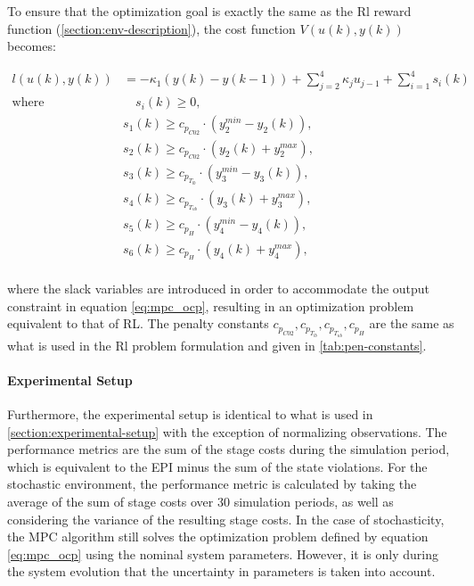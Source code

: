To ensure that the optimization goal is exactly the same as the Rl reward function (\autoref{section:env-description}), the cost function $V(u(k),y(k))$ becomes:

\begin{equation} \label{eq:mpc_cost_function}
	\begin{aligned}
		l(u(k),y(k)) & = - \kappa_1 (y(k) - y(k-1)) + \sum_{j=2}^4 {\kappa_j u_{j-1}} + \sum_{i = 1}^4 s_i(k) \\
		\text{where} & \quad s_i(k) \geq 0, \\
		& s_1(k) \geq c_{p_{C02}} \cdot (y_2^{min} - y_2(k)), \\ 
		& s_2(k) \geq c_{p_{C02}} \cdot (y_2(k) + y_2^{max}), \\ 
		& s_3(k) \geq c_{p_{T_{lb}}} \cdot (y_3^{min} - y_3(k)), \\ 
		& s_4(k) \geq c_{p_{T_{ub}}} \cdot (y_3(k) + y_3^{max}), \\ 
		& s_5(k) \geq c_{p_{H}} \cdot (y_4^{min} - y_4(k)), \\ 
		& s_6(k) \geq c_{p_{H}} \cdot (y_4(k) + y_4^{max}), \\
	\end{aligned}	
\end{equation}

where the slack variables are introduced in order to accommodate the output constraint in equation \autoref{eq:mpc_ocp}, resulting in an optimization problem equivalent to that of RL. The penalty constants $c_{p_{C02}},c_{p_{T_{lb}}},c_{p_{T_{ub}}},c_{p_{H}}$ are the same as what is used in the Rl problem formulation and given in \autoref{tab:pen-constants}.

\paragraph{Experimental Setup} Furthermore, the experimental setup is identical to what is used in \autoref{section:experimental-setup} with the exception of normalizing observations. The performance metrics are the sum of the stage costs during the simulation period, which is equivalent to the EPI minus the sum of the state violations. For the stochastic environment, the performance metric is calculated by taking the average of the sum of stage costs over 30 simulation periods, as well as considering the variance of the resulting stage costs. In the case of stochasticity, the MPC algorithm still solves the optimization problem defined by equation \autoref{eq:mpc_ocp} using the nominal system parameters. However, it is only during the system evolution that the uncertainty in parameters is taken into account. 

